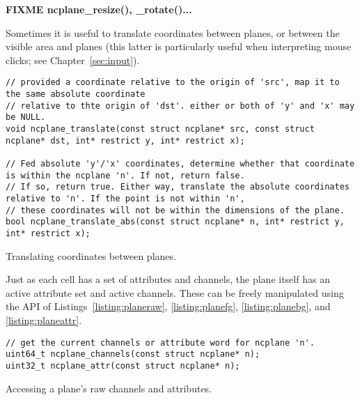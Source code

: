\textbf{FIXME ncplane\_resize(), \_rotate()...}

Sometimes it is useful to translate coordinates between planes, or between the
visible area and planes (this latter is particularly useful when interpreting
mouse clicks; see Chapter~\ref{sec:input}).
\begin{listing}[!htb]
\begin{verbatim}
// provided a coordinate relative to the origin of 'src', map it to the same absolute coordinate
// relative to thte origin of 'dst'. either or both of 'y' and 'x' may be NULL.
void ncplane_translate(const struct ncplane* src, const struct ncplane* dst, int* restrict y, int* restrict x);

// Fed absolute 'y'/'x' coordinates, determine whether that coordinate is within the ncplane 'n'. If not, return false.
// If so, return true. Either way, translate the absolute coordinates relative to 'n'. If the point is not within 'n',
// these coordinates will not be within the dimensions of the plane.
bool ncplane_translate_abs(const struct ncplane* n, int* restrict y, int* restrict x);
\end{verbatim}
\caption{Translating coordinates between planes.}
\end{listing}

Just as each cell has a set of attributes and channels, the plane itself has
an active attribute set and active channels. These can be freely manipulated
using the API of Listings~\ref{listing:planeraw}, \ref{listing:planefg}, \ref{listing:planebg}, and
\ref{listing:planeattr}.

\begin{listing}[!htb]
\begin{verbatim}
// get the current channels or attribute word for ncplane 'n'.
uint64_t ncplane_channels(const struct ncplane* n);
uint32_t ncplane_attr(const struct ncplane* n);
\end{verbatim}
\caption{Accessing a plane's raw channels and attributes.}
\label{listing:planeraw}
\end{listing}

